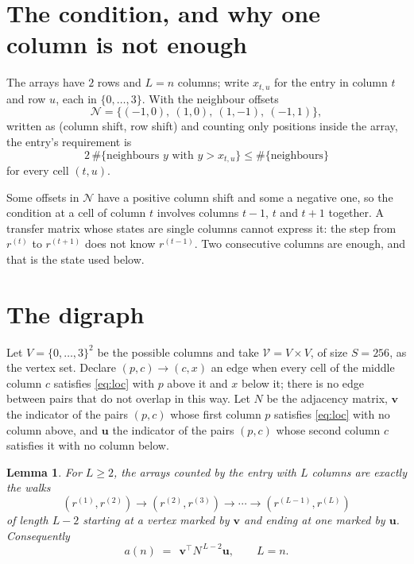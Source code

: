 \documentclass[11pt,a4paper]{article}
\theoremstyle{plain}
\newtheorem{lemma}[theorem]{Lemma}
\theoremstyle{definition}
\begin{document}
\section{The condition, and why one column is not enough}

The arrays have $2$ rows and $L=n$ columns; write $x_{t,u}$ for the entry in
column $t$ and row $u$, each in $\{0,\dots,3\}$. With the neighbour offsets
\[
\mathcal N=\{(-1,0),\ (1,0),\ (1,-1),\ (-1,1)\},
\]
written as (column shift, row shift) and counting only positions inside the array, the
entry's requirement is
\begin{equation}\label{eq:loc}
2\,\#\{\text{neighbours }y\text{ with }y>x_{t,u}\}\le\#\{\text{neighbours}\}
\end{equation}
for every cell $(t,u)$.

Some offsets in $\mathcal N$ have a positive column shift and some a negative one, so the
condition at a cell of column $t$ involves columns $t-1$, $t$ and $t+1$ together. A transfer
matrix whose states are single columns cannot express it: the step from $r^{(t)}$ to
$r^{(t+1)}$ does not know $r^{(t-1)}$. Two consecutive columns are enough, and that is
the state used below.

\section{The digraph}

Let $V=\{0,\dots,3\}^{2}$ be the possible columns and take
$\mathcal V=V\times V$, of size $S=256$, as the vertex set. Declare $(p,c)\to(c,x)$ an edge
when every cell of the middle column $c$ satisfies \eqref{eq:loc} with $p$ above it and $x$
below it; there is no edge between pairs that do not overlap in this way. Let $N$ be the
adjacency matrix, $\mathbf{v}$ the indicator of the pairs $(p,c)$ whose first column $p$
satisfies \eqref{eq:loc} with no column above, and $\mathbf{u}$ the indicator of
the pairs $(p,c)$ whose second column $c$ satisfies it with no column below.

\begin{lemma}\label{lem:walk}
For $L\ge2$, the arrays counted by the entry with $L$ columns are exactly the walks
\[
(r^{(1)},r^{(2)})\to(r^{(2)},r^{(3)})\to\cdots\to(r^{(L-1)},r^{(L)})
\]
of length $L-2$ starting at a vertex marked by $\mathbf{v}$ and ending at one marked by
$\mathbf{u}$. Consequently
\[
a(n)\;=\;\,\mathbf{v}^{\!\top}N^{\,L-2}\mathbf{u},\qquad L=n .
\]
\end{lemma}
\end{document}
